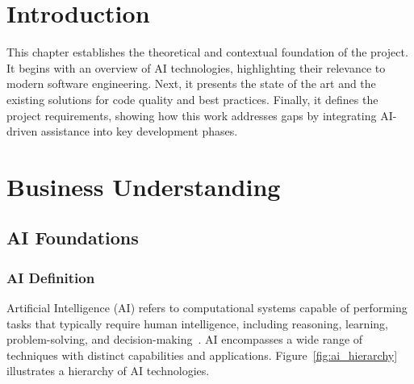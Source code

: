 \begin{spacing}{1.2}

\section*{Introduction}
This chapter establishes the theoretical and contextual foundation of the project. It begins with an overview of AI technologies, highlighting their relevance to modern software engineering. Next, it presents the state of the art and the existing solutions for code quality and best practices. Finally, it defines the project requirements, showing how this work addresses gaps by integrating AI-driven assistance into key development phases.

\section{Business Understanding}

\subsection{AI Foundations}
\subsubsection{AI Definition}
Artificial Intelligence (AI) refers to computational systems capable of performing tasks that typically require human intelligence, including reasoning, learning, problem-solving, and decision-making~\cite{ai2024definition}. AI encompasses a wide range of techniques with distinct capabilities and applications. Figure~\ref{fig:ai_hierarchy} illustrates a hierarchy of AI technologies.


\end{spacing}

